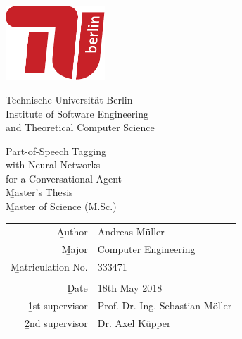 
\pagestyle{empty}

\begin{center}
\includegraphics[width=0.28\textwidth]{images/logo_tu_berlin}
\vspace{8mm}

{\huge Technische Universität Berlin}\\
\vspace{2mm}
{\large Institute of Software Engineering\\and Theoretical Computer Science}\\
\vspace{11mm}

{\Huge Part-of-Speech Tagging\\[-2mm] with Neural Networks\\[-2mm] for a Conversational Agent\\}
\vspace{20mm}
{\Huge \b{Master's Thesis}}\\
{\b{Master of Science (M.Sc.)}}\\
\vspace{24mm}
\begin{tabular}{rl}
  \b{Author} & Andreas Müller\\
  \b{Major} & Computer Engineering\\
  \b{Matriculation No.} & 333471\\
   & \\
  \b{Date} & 18th May 2018 \\
  \b{1st supervisor} & Prof. Dr.-Ing. Sebastian Möller \\
  \b{2nd supervisor} & Dr. Axel Küpper \\
\end{tabular}

\end{center}
\clearpage
\pagestyle{scrheadings} %

